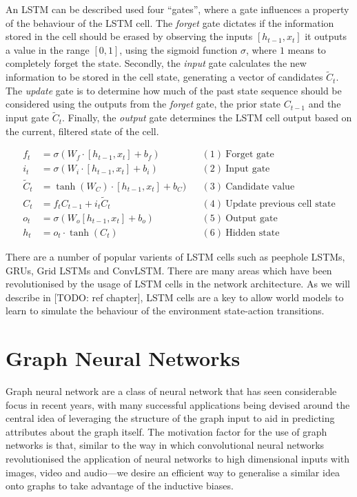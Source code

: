 An LSTM can be described used four ``gates'', where a gate influences a property of the behaviour of the LSTM cell. The \textit{forget} gate dictates if the information stored in the cell should be erased by observing the inputs $[h_{t-1}, x_t]$ it outputs a value in the range $[0, 1]$, using the sigmoid function $\sigma$, where $1$ means to completely forget the state. Secondly, the \textit{input} gate calculates the new information to be stored in the cell state, generating a vector of candidates $\tilde{C}_t$. The \textit{update} gate is to determine how much of the past state sequence should be considered using the outputs from the \textit{forget} gate, the prior state $C_{t-1}$ and the input gate $\tilde{C}_t$. Finally, the \textit{output} gate determines the LSTM cell output based on the current, filtered state of the cell.

\begin{center}
  \begin{align*}
    f_t &= \sigma (W_f \cdot [h_{t-1}, x_t] + b_f) && (1)~\text{Forget gate} \\
    i_t &= \sigma (W_i \cdot [h_{t-1}, x_t] + b_i) && (2)~\text{Input gate} \\
    \tilde{C}_t &= \tanh (W_C) \cdot [h_{t-1}, x_t] + b_C) && (3)~\text{Candidate value} \\
    C_t &= f_t C_{t-1} + i_t \tilde{C}_t && (4)~\text{Update previous cell state} \\
    o_t &= \sigma (W_o [h_{t-1}, x_t] + b_o) && (5)~\text{Output gate} \\
    h_t &= o_t \cdot \tanh (C_t) && (6)~\text{Hidden state}
  \end{align*}
\end{center}

There are a number of popular varients of LSTM cells such as peephole LSTMs, GRUs, Grid LSTMs and ConvLSTM. There are many areas which have been revolutionised by the usage of LSTM cells in the network architecture. As we will describe in [TODO: ref chapter], LSTM cells are a key to allow world models to learn to simulate the behaviour of the environment state-action transitions.

\section{Graph Neural Networks}

Graph neural network are a class of neural network that has seen considerable focus in recent years, with many successful applications being devised around the central idea of leveraging the structure of the graph input to aid in predicting attributes about the graph itself. The motivation factor for the use of graph networks is that, similar to the way in which convolutional neural networks revolutionised the application of neural networks to high dimensional inputs with images, video and audio---we desire an efficient way to generalise a similar idea onto graphs to take advantage of the inductive biases.

